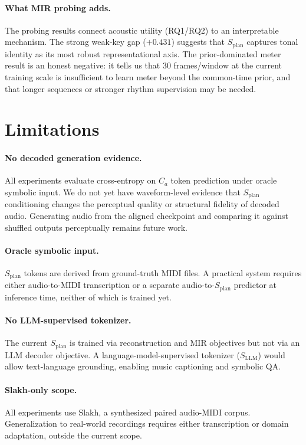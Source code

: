 \documentclass[11pt]{article}
\newcommand{\splan}{$S_{\mathrm{plan}}$}
\newcommand{\sllm}{$S_{\mathrm{LLM}}$}
\newcommand{\Camath}{C_a}
\begin{document}
\paragraph{What MIR probing adds.}
The probing results connect acoustic utility (RQ1/RQ2) to an interpretable mechanism.
The strong weak-key gap ($+0.431$) suggests that \splan{} captures tonal identity as
its most robust representational axis.  The prior-dominated meter result is an honest
negative: it tells us that 30 frames/window at the current training scale is
insufficient to learn meter beyond the common-time prior, and that longer sequences or
stronger rhythm supervision may be needed.

\section{Limitations}

\paragraph{No decoded generation evidence.}
All experiments evaluate cross-entropy on $\Camath$ token prediction under oracle
symbolic input.  We do not yet have waveform-level evidence that \splan{} conditioning
changes the perceptual quality or structural fidelity of decoded audio.  Generating
audio from the aligned checkpoint and comparing it against shuffled outputs perceptually
remains future work.

\paragraph{Oracle symbolic input.}
\splan{} tokens are derived from ground-truth MIDI files.  A practical system requires
either audio-to-MIDI transcription or a separate audio-to-\splan{} predictor at
inference time, neither of which is trained yet.

\paragraph{No LLM-supervised tokenizer.}
The current \splan{} is trained via reconstruction and MIR objectives but not via an
LLM decoder objective.  A language-model-supervised tokenizer (\sllm{}) would allow
text-language grounding, enabling music captioning and symbolic QA.

\paragraph{Slakh-only scope.}
All experiments use Slakh, a synthesized paired audio-MIDI corpus.  Generalization to
real-world recordings requires either transcription or domain adaptation, outside
the current scope.
\end{document}
